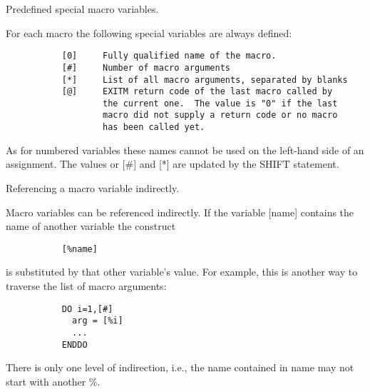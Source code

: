\ENDCMD


   \par
Predefined special macro variables.  

   \par
For each macro the following special variables are always defined:  

\begin{verbatim}
           [0]     Fully qualified name of the macro.
           [#]     Number of macro arguments
           [*]     List of all macro arguments, separated by blanks
           [@]     EXITM return code of the last macro called by
                   the current one.  The value is "0" if the last
                   macro did not supply a return code or no macro
                   has been called yet.
\end{verbatim}
\ENDVERB
   \par
As for numbered variables these names cannot be used on the left-hand side 
   of an assignment. The values or [\#] and [*] are updated by the SHIFT 
   statement.  

\ENDCMD


   \par
Referencing a macro variable indirectly.  

   \par
Macro variables can be referenced indirectly. If the variable [name] 
   contains the name of another variable the construct 

\begin{verbatim}
           [%name]
\end{verbatim}
\ENDVERB
   \par
is substituted by that other variable's value.  For example, this is 
   another way to traverse the list of macro arguments:  

\begin{verbatim}
           DO i=1,[#]
             arg = [%i]
             ...
           ENDDO
\end{verbatim}
\ENDVERB
   \par
There is only one level of indirection, i.e., the name contained in 
   \DQUOTE{}name\DQUOTE{} may not start with another \DQUOTE{}\%\DQUOTE{}.  

\ENDCMD


